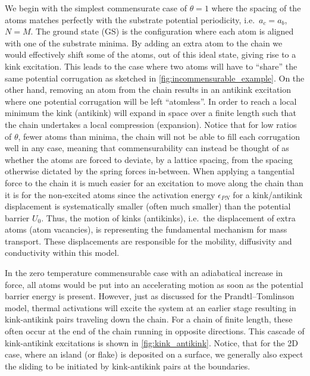 We begin with the simplest commensurate case of $\theta = 1$ where the spacing
of the atoms matches perfectly with the substrate potential periodicity, i.e.\
$a_c = a_b$, $N = M$. The ground state (\acrshort{GS}) is the configuration
where each atom is aligned with one of the substrate minima. By adding an extra
atom to the chain we would effectively shift some of the atoms, out of this
ideal state, giving rise to a kink excitation. This leads to the case where two
atoms will have to ``share'' the same potential corrugation as sketched in
\cref{fig:incommensurable_example}.  On the other hand, removing an atom from
the chain results in an antikink excitation where one potential corrugation will
be left ``atomless''. In order to reach a local minimum the kink (antikink) will
expand in space over a finite length such that the chain undertakes a local
compression (expansion). Notice that for low ratios of $\theta$, fewer atoms than minima, the chain will not be able to fill each corrugation well in any case, meaning that commensurability can instead be thought of as whether the atoms are forced to deviate, by a lattice spacing, from the spacing otherwise dictated by the spring forces in-between. When applying a tangential force to the chain it is much
easier for an excitation to move along the chain than it is for the non-excited
atoms since the activation energy $\epsilon_{PN}$ for a kink/antikink
displacement is systematically smaller (often much smaller) than the potential
barrier $U_0$. Thus, the motion of kinks (antikinks), i.e.\ the displacement of
extra atoms (atom vacancies), is representing the fundamental mechanism for
mass transport. These displacements are responsible for the mobility,
diffusivity and conductivity within this model. 

In the zero temperature commensurable case with an adiabatical increase in force, all atoms would be put into an accelerating motion as soon as the potential barrier energy is present. However, just as discussed for the Prandtl–Tomlinson model, thermal activations will excite the system at an earlier stage resulting in kink-antikink pairs traveling down the chain. For a chain of finite length, these often occur at the end of the chain running in opposite directions. This cascade of kink-antikink excitations is shown in \cref{fig:kink_antikink}. Notice, that for the 2D case, where an island (or flake) is deposited on a surface, we generally also expect the sliding to be initiated by kink-antikink pairs at the boundaries. 

